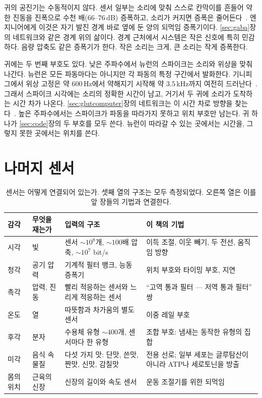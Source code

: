 귀의 공진기는 수동적이지 않다. 센서 일부는 소리에 맞춰 스스로 칸막이를 흔들어 약한 진동을 진폭으로 수천 배($66$--$76$\,dB) 증폭하고, 소리가 커지면 증폭은 줄어든다~\cite{Ruggero1997,Robles2001}. 엔지니어에게 이것은 자기 발진 경계 바로 옆에 둔 양의 되먹임 증폭기이다. \ref{sec:gaba}장의 네트워크와 같은 경계 위의 삶이다. 경계 근처에서 시스템은 작은 신호에 특히 민감하다. 음량 압축도 같은 증폭기가 한다. 작은 소리는 크게, 큰 소리는 작게 증폭한다.

귀에는 두 번째 부호도 있다. 낮은 주파수에서 뉴런의 스파이크는 소리와 위상을 맞춰 나간다. 뉴런은 모든 파동마다는 아니지만 각 파동의 특정 구간에서 발화한다. 기니피그에서 위상 고정은 약 $600$\,Hz에서 약해지기 시작해 약 $3.5$\,kHz까지 여전히 드러난다~\cite{PalmerRussell1986}. 그래서 스파이크 시각에는 소리의 정확한 시간이 남고, 거기서 두 귀에 소리가 도착하는 시간 차가 나온다. \ref{sec:glutcomputer}장의 네트워크는 이 시간 차로 방향을 찾는다~\cite{Grothe2010}. 높은 주파수에서는 스파이크가 파동을 따라가지 못하고 위치 부호만 남는다. 귀 하나가 \ref{sec:code}장의 두 부호를 모두 쓴다. 뉴런이 따라갈 수 있는 곳에서는 시간을, 그렇지 못한 곳에서는 위치를 쓴다.

\section{나머지 센서}

\begin{table}[t]
\centering
\footnotesize
\setlength{\tabcolsep}{3pt}
\renewcommand{\arraystretch}{1.15}
\begin{tabular}{>{\raggedright}p{1.9cm}>{\raggedright}p{2.6cm}>{\raggedright}p{4.0cm}>{\raggedright\arraybackslash}p{4.6cm}}
\toprule
감각 & 무엇을 재는가 & 입력의 구조 & 이 책의 기법 \\
\midrule
시각 & 빛 & 센서 $\sim10^8$개, $\sim100$배 압축, $\sim10^7$ bit/s & 이득 조절, 이웃 빼기, 두 전선, 움직임 방향 \\
청각 & 공기 압력 & 기계적 필터 뱅크, 능동 증폭기 & 위치 부호와 타이밍 부호, 지연 \\
촉각 & 압력, 진동 & 빨리 적응하는 센서와 느리게 적응하는 센서 & “고역 통과 필터 --- 저역 통과 필터” 쌍 \\
온도 & 열 & 따뜻함과 차가움의 별도 센서 & 이중 레일 부호 \\
후각 & 분자 & 수용체 유형 $\sim400$개, 센서마다 한 유형 & 조합 부호: 냄새는 동작한 유형의 집합 \\
미각 & 음식 속 물질 & 다섯 가지 맛: 단맛, 쓴맛, 짠맛, 신맛, 감칠맛 & 전용 선로; 일부 세포는 글루탐산이 아니라 ATP나 세로토닌을 방출 \\
몸의 위치 & 근육의 신장 & 신장의 길이와 속도 센서 & 운동 조절기를 위한 되먹임 \\
\bottomrule
\end{tabular}
\caption{센서는 어떻게 연결되어 있는가. 셋째 열의 구조는 모두 측정되었다. 오른쪽 열은 이를 앞 장들의 기법과 연결한다.}
\label{tab:sensors}
\end{table}

